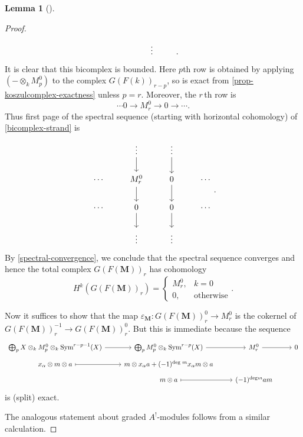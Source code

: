 \documentclass[a4paper]{article}
\theoremstyle{definition}
\newtheorem{lemma}[defn]{Lemma}
\theoremstyle{remark}
\DeclareMathOperator{\Sym}{\text{Sym}}
\begin{document}
\begin{lemma}[]
\begin{proof}
\begin{equation}
\begin{tikzcd}
                   & \vdots 
                   & 
            \end{tikzcd}.\end{equation}
        It is clear that this bicomplex is bounded. Here \(p\)th row is obtained
        by applying \((-\otimes_k M^0_p)\) to the complex \(G(F(k))_{r-p}\), so
        is exact from \cref{prop-koszulcomplex-exactness} unless \(p=r\).
        Moreover, the \(r\,\)th row is 
        \[ \cdots 0 \rightarrow M^0_r \rightarrow 0 \rightarrow \cdots. \]  
        Thus first page of the spectral sequence (starting with horizontal
        cohomology) of \eqref{bicomplex-strand} is 
        \[\begin{tikzcd} 
                   & \vdots \arrow[d]
                   & \vdots \arrow[d]
                   & \\
            \cdots 
                   & M^0_r \arrow[d]
                   & 0 \arrow[d]
                   & \cdots \\
            \cdots  
                   & 0 \arrow[d]
                   & 0 \arrow[d]
                   & \cdots \\
                   & \vdots
                   & \vdots 
                   & 
        \end{tikzcd}.\]
        By \cref{spectral-convergence}, we conclude that the spectral sequence
        converges and hence the total complex \(G(F(\mathbf{M}))_r\) has cohomology 
        \[H^k(G(F(\mathbf{M}))_r)=\begin{cases} M^0_r, &k=0 \\ 
        0, &\text{otherwise}\end{cases}.\]

        Now it suffices to show that the map
        \(\varepsilon_{\mathbf{M}}:G(F(\mathbf{M}))^0_r \rightarrow M^0_r\) is
        the cokernel of \({G(F(\mathbf{M}))^{-1}_r \rightarrow
        G(F(\mathbf{M}))^0_r}\). But this is immediate because the
        sequence 
        \[\begin{tikzcd}[row sep=tiny] 
            \bigoplus_p X\otimes_k M^0_p \otimes_k \Sym^{r-p-1}(X) 
            \arrow[r]
            & \bigoplus_p  M^0_p \otimes_k \Sym^{r-p}(X) 
            \arrow[r]
            & M^0_r 
            \arrow[r]
            & 0 \\
            x_\alpha \otimes m \otimes a
            \arrow[r, mapsto]
            & m \otimes x_\alpha a + (-1)^{\text{deg }m} x_\alpha m \otimes a
            & \\ 
            & m \otimes a  
            \arrow[r, mapsto]
            & (-1)^{\text{deg} m}am
        \end{tikzcd}\]
        is (split) exact.

        The analogous statement about graded \(A^!\)-modules follows from a
        similar calculation.
        \end{proof}
\end{lemma}
\end{document}
